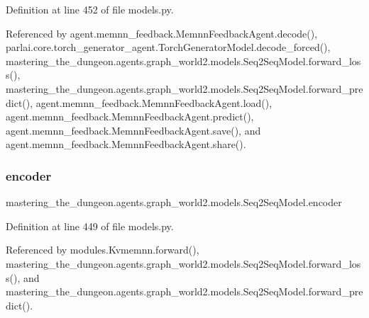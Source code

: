 Definition at line 452 of file models.\+py.



Referenced by agent.\+memnn\+\_\+feedback.\+Memnn\+Feedback\+Agent.\+decode(), parlai.\+core.\+torch\+\_\+generator\+\_\+agent.\+Torch\+Generator\+Model.\+decode\+\_\+forced(), mastering\+\_\+the\+\_\+dungeon.\+agents.\+graph\+\_\+world2.\+models.\+Seq2\+Seq\+Model.\+forward\+\_\+loss(), mastering\+\_\+the\+\_\+dungeon.\+agents.\+graph\+\_\+world2.\+models.\+Seq2\+Seq\+Model.\+forward\+\_\+predict(), agent.\+memnn\+\_\+feedback.\+Memnn\+Feedback\+Agent.\+load(), agent.\+memnn\+\_\+feedback.\+Memnn\+Feedback\+Agent.\+predict(), agent.\+memnn\+\_\+feedback.\+Memnn\+Feedback\+Agent.\+save(), and agent.\+memnn\+\_\+feedback.\+Memnn\+Feedback\+Agent.\+share().

\mbox{\label{classmastering__the__dungeon_1_1agents_1_1graph__world2_1_1models_1_1Seq2SeqModel_a31f2ec8eb6dbf2926fc11d5387e70281}} 
\subsubsection{\texorpdfstring{encoder}{encoder}}
{\footnotesize\ttfamily mastering\+\_\+the\+\_\+dungeon.\+agents.\+graph\+\_\+world2.\+models.\+Seq2\+Seq\+Model.\+encoder}



Definition at line 449 of file models.\+py.



Referenced by modules.\+Kvmemnn.\+forward(), mastering\+\_\+the\+\_\+dungeon.\+agents.\+graph\+\_\+world2.\+models.\+Seq2\+Seq\+Model.\+forward\+\_\+loss(), and mastering\+\_\+the\+\_\+dungeon.\+agents.\+graph\+\_\+world2.\+models.\+Seq2\+Seq\+Model.\+forward\+\_\+predict().

\mbox{\label{classmastering__the__dungeon_1_1agents_1_1graph__world2_1_1models_1_1Seq2SeqModel_a3a1f790f22b69102e3734361de8f7091}} 
